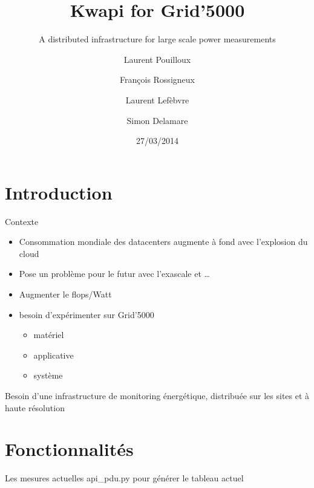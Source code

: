 \documentclass{beamer}
\title{Kwapi for Grid'5000}
\subtitle{A distributed infrastructure for large scale power measurements}
\author[LIP Team]{Laurent Pouilloux \and François Rossigneux \and Laurent
Lefèbvre \and Simon Delamare}
\institute[INRIA/LIP ENS-Lyon]{INRIA/LIP ENS-Lyon}
\date{27/03/2014}
\begin{document}
\begin{frame}
\titlepage
\end{frame}
%
%
\section*{Introduction}

\begin{frame}{Contexte}
\begin{itemize}
  \item Consommation mondiale des datacenters augmente à fond avec l'explosion
  du cloud
  \item Pose un problème pour le futur avec l'exascale et \ldots
  \item Augmenter le flops/Watt
  \item besoin d'expérimenter sur Grid'5000
  \begin{itemize}
    \item matériel
    \item applicative
    \item système
  \end{itemize}
\end{itemize}

\alert{Besoin d'une infrastructure de monitoring énergétique, distribuée sur
les sites et à haute résolution}
\end{frame}


\section{Fonctionnalités}

\begin{frame}{Les mesures actuelles}
api\_pdu.py pour générer le tableau actuel
\end{frame}
\end{document}
